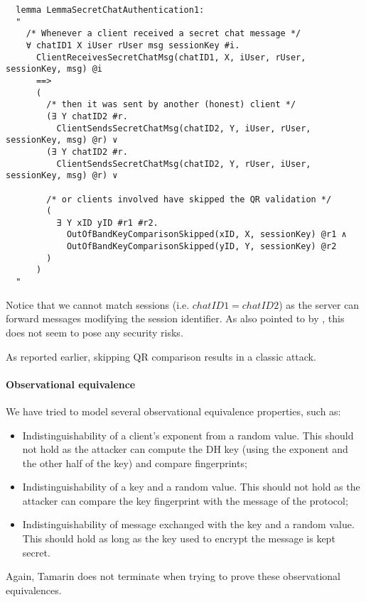 \begin{lstlisting}
  lemma LemmaSecretChatAuthentication1:
  "
    /* Whenever a client received a secret chat message */
    ∀ chatID1 X iUser rUser msg sessionKey #i.
      ClientReceivesSecretChatMsg(chatID1, X, iUser, rUser, sessionKey, msg) @i
      ==>
      (
        /* then it was sent by another (honest) client */
        (∃ Y chatID2 #r. 
          ClientSendsSecretChatMsg(chatID2, Y, iUser, rUser, sessionKey, msg) @r) ∨
        (∃ Y chatID2 #r. 
          ClientSendsSecretChatMsg(chatID2, Y, rUser, iUser, sessionKey, msg) @r) ∨

        /* or clients involved have skipped the QR validation */
        (
          ∃ Y xID yID #r1 #r2. 
            OutOfBandKeyComparisonSkipped(xID, X, sessionKey) @r1 ∧
            OutOfBandKeyComparisonSkipped(yID, Y, sessionKey) @r2
        )
      )
  "
\end{lstlisting}

Notice that we cannot match sessions (i.e. $chatID1 = chatID2$) as the server can forward messages modifying the session identifier. As also pointed to by \MMNV{} \cite{MTProto2-Proverif}, this does not seem to pose any security risks.

As reported earlier, skipping QR comparison results in a classic \DiHe{} \mitm{} attack.

\paragraph{Observational equivalence} We have tried to model several observational equivalence properties, such as:
\begin{itemize}
  \item Indistinguishability of a client's exponent from a random value. This should not hold as the attacker can compute the DH key (using the exponent and the other half of the key) and compare fingerprints;
  \item Indistinguishability of a \schat{} key and a random value. This should not hold as the attacker can compare the key fingerprint with the  message of the protocol;
  \item Indistinguishability of message exchanged with the \schat{} key and a random value. This should hold as long as the key used to encrypt the message is kept secret.
\end{itemize}

Again, Tamarin does not terminate when trying to prove these observational equivalences.




